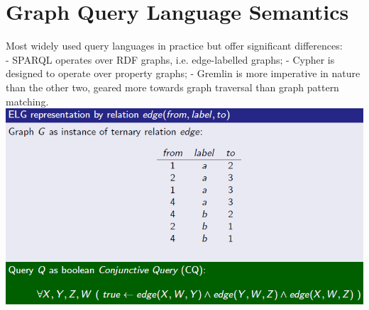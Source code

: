 \documentclass{article}
\begin{document}
\section{Graph Query Language Semantics}
Most widely used query languages in practice but offer significant differences:\\
- SPARQL operates over RDF graphs, i.e. edge-labelled graphs;
- Cypher is designed to operate over property graphs;
- Gremlin is more imperative in nature than the other two, geared more towards graph traversal than graph pattern matching.\\
\includegraphics[scale=0.6]{55.png}\\\\
\end{document}
